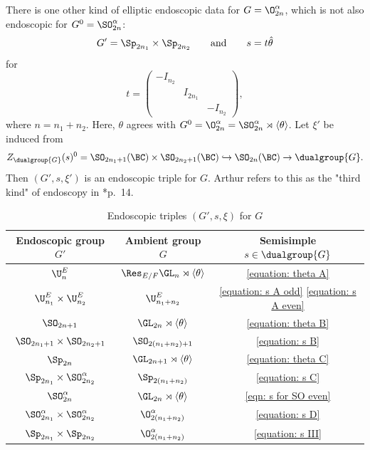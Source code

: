 \documentclass[11pt,letterpaper]{amsart}
\numberwithin{equation}{section}
\begin{document}
There is one other kind of elliptic endoscopic data for $G = \O^{\alpha}_{2n}$, which is not also endoscopic for $G^0 = \SO^{\alpha}_{2n}$:
\begin{equation}\label{equation: s III}
G' = \Sp_{2n_1}\times \Sp_{2n_2}
\qquad\text{and}\qquad
s = t{\hat\theta}
\end{equation}
for 
\[
t =
\begin{pmatrix}
 -I_{n_2}&&\\
&I_{2{n_1}}&\\
&&-I_{n_2}    
\end{pmatrix},
\]
where $n= n_1+n_2$.
Here, $\theta$ agrees with $G^0 = \O^{\alpha}_{2n} = \SO^{\alpha}_{2n}\rtimes{\langle{\theta} \rangle}$.
Let $\xi'$ be induced from
\[
Z_{\dualgroup{G}}(s)^0 
=
\SO_{2n_1+1}(\BC)\times\SO_{2n_2+1}(\BC)
\hookrightarrow
\SO_{2n}(\BC)
\to
\dualgroup{G}.
\]
Then $(G',s,\xi')$ is an endoscopic triple for $G$. Arthur refers to this as the "third kind" of endoscopy in \cite{Art13}*{p.~14}.


\begin{table}[ht]
\label{table: endo summary}
\caption{Endoscopic triples $(G',s,\xi)$ for $G$}
\begin{tabular}{|c|c|c| } 
 \hline
Endoscopic group $G'$ & Ambient group $G$ & Semisimple $s\in \dualgroup{G}$ \\
\hline
\hline
$\U^E_n$ & $\Res_{E/F}\GL_n\rtimes{\langle\theta\rangle}$ &   
\eqref{equation: theta A}
\\
$\U^{E}_{n_1}\times\U^{E}_{n_2}$ & $\U^{E}_{n_1+n_2}$ & \eqref{equation: s A odd} \eqref{equation: s A even} 
\\
\hline
$\SO_{2n+1}$ & $\GL_{2n}\rtimes{\langle\theta\rangle}$ & 
\eqref{equation: theta B}
\\
$\SO_{2n_1+1} \times \SO_{2n_2+1}$ & $\SO_{2(n_1+n_2)+1}$ &
\eqref{equation: s B}
\\
\hline
$\Sp_{2n}$ & $\GL_{2n+1}\rtimes{\langle\theta\rangle}$ & 
\eqref{equation: theta C}
\\
$\Sp_{2n_1} \times \SO^{\alpha}_{2n_2}$ & $\Sp_{2(n_1+n_2)}$ & 
\eqref{equation: s C}
\\
\hline
$\SO^\alpha_{2n}$ & $\GL_{2n}\rtimes{\langle\theta\rangle}$ & 
\eqref{eqn: s for SO even}
\\
$\SO^{\alpha}_{2n_1} \times \SO^{\alpha}_{2n_2}$ & $\O^{\alpha}_{2(n_1+n_2)}$ &  
\eqref{equation: s D}
\\
$\Sp_{2n_1} \times \Sp_{2n_2}$ & 
$\O^\alpha_{2(n_1+n_2)}$
& 
\eqref{equation: s III} 
\\
\hline
\end{tabular}
\end{table}
\end{document}
